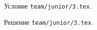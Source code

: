 \problem
Условие \texttt{team/junior/3.tex}.

\solution Решение \texttt{team/junior/3.tex}.
\endproblem
